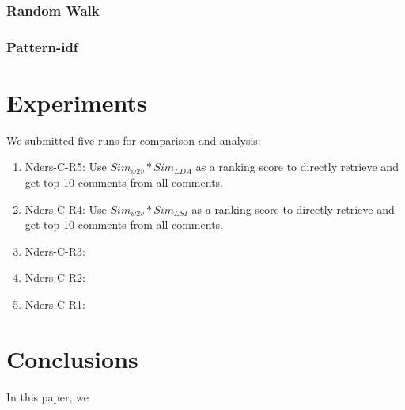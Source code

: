 \documentclass{llncs}
\begin{document}
\subsubsection{Random Walk}

\subsubsection{Pattern-idf}

\section{Experiments}
We submitted five runs for comparison and analysis:

\begin{enumerate}
  \item{Nders-C-R5: } Use $Sim_{w2v}*Sim_{LDA}$ as a ranking score to directly 
  retrieve and get top-10 comments from all comments.
  \item{Nders-C-R4: } Use $Sim_{w2v}*Sim_{LSI}$ as a ranking score to directly 
  retrieve and get top-10 comments from all comments.
  \item{Nders-C-R3: }
  \item{Nders-C-R2: }
  \item{Nders-C-R1: }
\end{enumerate}

\section{Conclusions}

In this paper, we  

%
%
\begin{thebibliography}{5}




\end{thebibliography}
\end{document}
